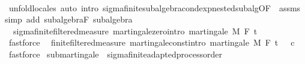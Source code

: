 \begin{isabellebody}
\ \ \isamarkupfalse%
\ {\isacharparenleft}{\kern0pt}unfold{\isacharunderscore}{\kern0pt}locales{\isacharparenright}{\kern0pt}\ {\isacharparenleft}{\kern0pt}auto\ intro{\isacharcolon}{\kern0pt}\ sigma{\isacharunderscore}{\kern0pt}finite{\isacharunderscore}{\kern0pt}subalgebra{\isachardot}{\kern0pt}cond{\isacharunderscore}{\kern0pt}exp{\isacharunderscore}{\kern0pt}nested{\isacharunderscore}{\kern0pt}subalg{\isacharbrackleft}{\kern0pt}OF\ {\isacharunderscore}{\kern0pt}\ assms{\isacharbrackright}{\kern0pt}\ simp\ add{\isacharcolon}{\kern0pt}\ subalgebra{\isacharunderscore}{\kern0pt}F\ subalgebra{\isacharparenright}{\kern0pt}%
\endisatagproof
{\isafoldproof}%
%
\isadelimproof
\isanewline
%
\endisadelimproof
\isanewline
{}\isamarkupfalse%
\ {\isacharparenleft}{\kern0pt}\ sigma{\isacharunderscore}{\kern0pt}finite{\isacharunderscore}{\kern0pt}filtered{\isacharunderscore}{\kern0pt}measure{\isacharparenright}{\kern0pt}\ martingale{\isacharunderscore}{\kern0pt}zero{\isacharbrackleft}{\kern0pt}intro{\isacharbrackright}{\kern0pt}{\isacharcolon}{\kern0pt}\ {\isachardoublequoteopen}martingale\ M\ F\ t\ {\isacharparenleft}{\kern0pt}{\isasymlambda}{\isacharunderscore}{\kern0pt}\ {\isacharunderscore}{\kern0pt}{\isachardot}{\kern0pt}\ {}{\isacharparenright}{\kern0pt}{\isachardoublequoteclose}%
\isadelimproof
\ %
\endisadelimproof
%
\isatagproof
{}\isamarkupfalse%
\ fastforce%
\endisatagproof
{\isafoldproof}%
%
\isadelimproof
%
\endisadelimproof
\isanewline
\isanewline
{}\isamarkupfalse%
\ {\isacharparenleft}{\kern0pt}\ finite{\isacharunderscore}{\kern0pt}filtered{\isacharunderscore}{\kern0pt}measure{\isacharparenright}{\kern0pt}\ martingale{\isacharunderscore}{\kern0pt}const{\isacharbrackleft}{\kern0pt}intro{\isacharbrackright}{\kern0pt}{\isacharcolon}{\kern0pt}\ {\isachardoublequoteopen}martingale\ M\ F\ t\ {\isacharparenleft}{\kern0pt}{\isasymlambda}{\isacharunderscore}{\kern0pt}\ {\isacharunderscore}{\kern0pt}{\isachardot}{\kern0pt}\ c{\isacharparenright}{\kern0pt}{\isachardoublequoteclose}%
\isadelimproof
\ %
\endisadelimproof
%
\isatagproof
{}\isamarkupfalse%
\ fastforce%
\endisatagproof
{\isafoldproof}%
%
\isadelimproof
%
\endisadelimproof
%
\isadelimdocument
%
\endisadelimdocument
%
\isatagdocument
%
\isamarkuptrue%
%
\endisatagdocument
{\isafolddocument}%
%
\isadelimdocument
%
\endisadelimdocument
{}\isamarkupfalse%
\ submartingale\ {\isacharequal}{\kern0pt}\ sigma{\isacharunderscore}{\kern0pt}finite{\isacharunderscore}{\kern0pt}adapted{\isacharunderscore}{\kern0pt}process{\isacharunderscore}{\kern0pt}order\ {\isacharplus}{\kern0pt}\isanewline

\end{isabellebody}
